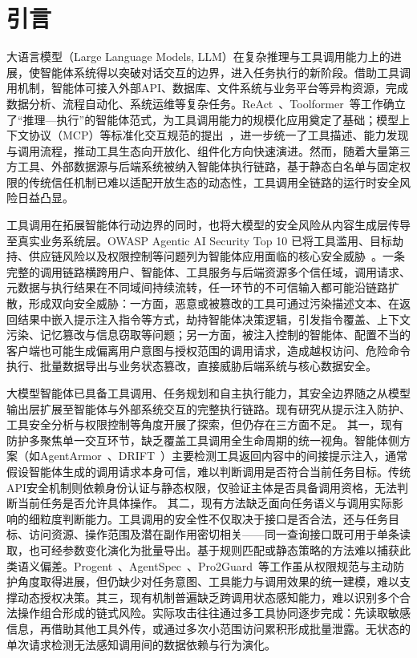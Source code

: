 \section{引言}
\label{sec:introduction}

大语言模型（Large Language Models, LLM）在复杂推理与工具调用能力上的进展，使智能体系统得以突破对话交互的边界，进入任务执行的新阶段。借助工具调用机制，智能体可接入外部API、数据库、文件系统与业务平台等异构资源，完成数据分析、流程自动化、系统运维等复杂任务。ReAct~\cite{yao2023ReAct}、Toolformer~\cite{schick2023Toolformer}等工作确立了“推理—执行”的智能体范式，为工具调用能力的规模化应用奠定了基础；模型上下文协议（MCP）等标准化交互规范的提出~\cite{anthropic2025MCP}，进一步统一了工具描述、能力发现与调用流程，推动工具生态向开放化、组件化方向快速演进。然而，随着大量第三方工具、外部数据源与后端系统被纳入智能体执行链路，基于静态白名单与固定权限的传统信任机制已难以适配开放生态的动态性，工具调用全链路的运行时安全风险日益凸显。

工具调用在拓展智能体行动边界的同时，也将大模型的安全风险从内容生成层传导至真实业务系统层。OWASP Agentic AI Security Top 10 已将工具滥用、目标劫持、供应链风险以及权限控制等问题列为智能体应用面临的核心安全威胁~\cite{owasp_agentic_ai_2026}。一条完整的调用链路横跨用户、智能体、工具服务与后端资源多个信任域，调用请求、元数据与执行结果在不同域间持续流转，任一环节的不可信输入都可能沿链路扩散，形成双向安全威胁：一方面，恶意或被篡改的工具可通过污染描述文本、在返回结果中嵌入提示注入指令等方式，劫持智能体决策逻辑，引发指令覆盖、上下文污染、记忆篡改与信息窃取等问题；另一方面，被注入控制的智能体、配置不当的客户端也可能生成偏离用户意图与授权范围的调用请求，造成越权访问、危险命令执行、批量数据导出与业务状态篡改，直接威胁后端系统与核心数据安全。


大模型智能体已具备工具调用、任务规划和自主执行能力，其安全边界随之从模型输出层扩展至智能体与外部系统交互的完整执行链路。现有研究从提示注入防护、工具安全分析与权限控制等角度开展了探索，但仍存在三方面不足。
其一，现有防护多聚焦单一交互环节，缺乏覆盖工具调用全生命周期的统一视角。智能体侧方案（如AgentArmor~\cite{wang2025AgentArmor}、DRIFT~\cite{li2025DRIFT}）主要检测工具返回内容中的间接提示注入，通常假设智能体生成的调用请求本身可信，难以判断调用是否符合当前任务目标。传统API安全机制则依赖身份认证与静态权限，仅验证主体是否具备调用资格，无法判断当前任务是否允许具体操作。
其二，现有方法缺乏面向任务语义与调用实际影响的细粒度判断能力。工具调用的安全性不仅取决于接口是否合法，还与任务目标、访问资源、操作范围及潜在副作用密切相关——同一查询接口既可用于单条读取，也可经参数变化演化为批量导出。基于规则匹配或静态策略的方法难以捕获此类语义偏差。Progent~\cite{shi2025Progent}、AgentSpec~\cite{wang2026AgentSpec}、Pro2Guard~\cite{wang2025Pro2Guard}等工作虽从权限规范与主动防护角度取得进展，但仍缺少对任务意图、工具能力与调用效果的统一建模，难以支撑动态授权决策。其三，现有机制普遍缺乏跨调用状态感知能力，难以识别多个合法操作组合形成的链式风险。实际攻击往往通过多工具协同逐步完成：先读取敏感信息，再借助其他工具外传，或通过多次小范围访问累积形成批量泄露。无状态的单次请求检测无法感知调用间的数据依赖与行为演化。

